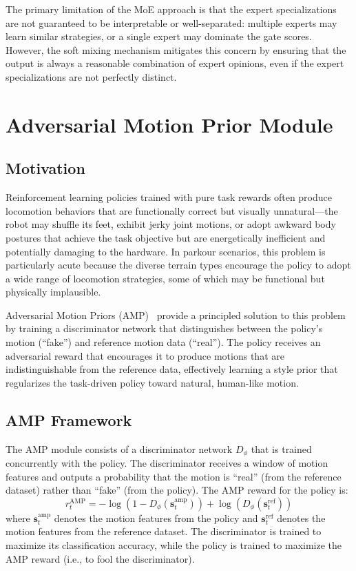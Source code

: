 The primary limitation of the MoE approach is that the expert specializations are not guaranteed to be interpretable or well-separated: multiple experts may learn similar strategies, or a single expert may dominate the gate scores. However, the soft mixing mechanism mitigates this concern by ensuring that the output is always a reasonable combination of expert opinions, even if the expert specializations are not perfectly distinct.

\section{Adversarial Motion Prior Module}
\label{sec:amp_module}

\subsection{Motivation}

Reinforcement learning policies trained with pure task rewards often produce locomotion behaviors that are functionally correct but visually unnatural---the robot may shuffle its feet, exhibit jerky joint motions, or adopt awkward body postures that achieve the task objective but are energetically inefficient and potentially damaging to the hardware. In parkour scenarios, this problem is particularly acute because the diverse terrain types encourage the policy to adopt a wide range of locomotion strategies, some of which may be functional but physically implausible.

Adversarial Motion Priors (AMP)~\cite{peng2021amp} provide a principled solution to this problem by training a discriminator network that distinguishes between the policy's motion (``fake'') and reference motion data (``real''). The policy receives an adversarial reward that encourages it to produce motions that are indistinguishable from the reference data, effectively learning a style prior that regularizes the task-driven policy toward natural, human-like motion.

\subsection{AMP Framework}

The AMP module consists of a discriminator network $D_\phi$ that is trained concurrently with the policy. The discriminator receives a window of motion features and outputs a probability that the motion is ``real'' (from the reference dataset) rather than ``fake'' (from the policy). The AMP reward for the policy is:
\begin{equation}
    r_t^{\text{AMP}} = -\log(1 - D_\phi(\mathbf{s}_t^{\text{amp}})) + \log(D_\phi(\mathbf{s}_t^{\text{ref}}))
\end{equation}
where $\mathbf{s}_t^{\text{amp}}$ denotes the motion features from the policy and $\mathbf{s}_t^{\text{ref}}$ denotes the motion features from the reference dataset. The discriminator is trained to maximize its classification accuracy, while the policy is trained to maximize the AMP reward (i.e., to fool the discriminator).

